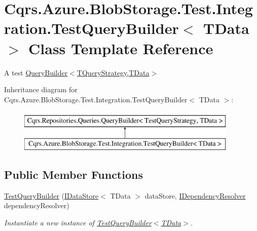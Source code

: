 \hypertarget{classCqrs_1_1Azure_1_1BlobStorage_1_1Test_1_1Integration_1_1TestQueryBuilder}{}\section{Cqrs.\+Azure.\+Blob\+Storage.\+Test.\+Integration.\+Test\+Query\+Builder$<$ T\+Data $>$ Class Template Reference}
\label{classCqrs_1_1Azure_1_1BlobStorage_1_1Test_1_1Integration_1_1TestQueryBuilder}


A test \hyperlink{classCqrs_1_1Repositories_1_1Queries_1_1QueryBuilder_a8a7b6495f78adedc7b7a82d2c83f17d5_a8a7b6495f78adedc7b7a82d2c83f17d5}{Query\+Builder$<$\+T\+Query\+Strategy,\+T\+Data$>$}  


Inheritance diagram for Cqrs.\+Azure.\+Blob\+Storage.\+Test.\+Integration.\+Test\+Query\+Builder$<$ T\+Data $>$\+:\begin{figure}[H]
\begin{center}
\leavevmode
\includegraphics[height=2.000000cm]{classCqrs_1_1Azure_1_1BlobStorage_1_1Test_1_1Integration_1_1TestQueryBuilder}
\end{center}
\end{figure}
\subsection*{Public Member Functions}
\begin{DoxyCompactItemize}
\item 
\hyperlink{classCqrs_1_1Azure_1_1BlobStorage_1_1Test_1_1Integration_1_1TestQueryBuilder_a22e5b4e327afe4f0f0d34e273dfd72ac_a22e5b4e327afe4f0f0d34e273dfd72ac}{Test\+Query\+Builder} (\hyperlink{interfaceCqrs_1_1DataStores_1_1IDataStore}{I\+Data\+Store}$<$ T\+Data $>$ data\+Store, \hyperlink{interfaceCqrs_1_1Configuration_1_1IDependencyResolver}{I\+Dependency\+Resolver} dependency\+Resolver)
\begin{DoxyCompactList}\small\item\em Instantiate a new instance of \hyperlink{classCqrs_1_1Azure_1_1BlobStorage_1_1Test_1_1Integration_1_1TestQueryBuilder_a22e5b4e327afe4f0f0d34e273dfd72ac_a22e5b4e327afe4f0f0d34e273dfd72ac}{Test\+Query\+Builder$<$\+T\+Data$>$}. \end{DoxyCompactList}\end{DoxyCompactItemize}
